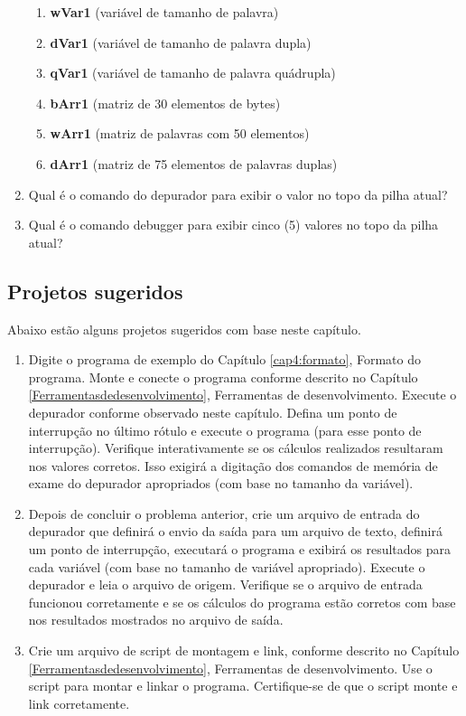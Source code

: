 \begin{enumerate}
\begin{enumerate}
    	\item \textbf{wVar1} (variável de tamanho de palavra)
    	\item \textbf{dVar1} (variável de tamanho de palavra dupla)
    	\item \textbf{qVar1} (variável de tamanho de palavra quádrupla)
    	\item \textbf{bArr1} (matriz de 30 elementos de bytes)
    	\item \textbf{wArr1} (matriz de palavras com 50 elementos)
    	\item \textbf{dArr1} (matriz de 75 elementos de palavras duplas)
    \end{enumerate}
    \item  Qual é o comando do depurador para exibir o valor no topo da pilha atual?
    \item Qual é o comando debugger para exibir cinco (5) valores no topo da pilha atual?
\end{enumerate}

\subsection{Projetos sugeridos}
Abaixo estão alguns projetos sugeridos com base neste capítulo.
\begin{enumerate}
	\item Digite o programa de exemplo do Capítulo \ref{cap4:formato}, Formato do programa. Monte e conecte o programa conforme descrito no Capítulo \ref{Ferramentasdedesenvolvimento}, Ferramentas de desenvolvimento. Execute o depurador conforme observado neste capítulo. Defina um ponto de interrupção no último rótulo e execute o programa (para esse ponto de interrupção). Verifique interativamente se os cálculos realizados resultaram nos valores corretos. Isso exigirá a digitação dos comandos de memória de exame do depurador apropriados (com base no tamanho da variável).
	\item Depois de concluir o problema anterior, crie um arquivo de entrada do depurador que definirá o envio da saída para um arquivo de texto, definirá um ponto de interrupção, executará o programa e exibirá os resultados para cada variável (com base no tamanho de variável apropriado). Execute o depurador e leia o arquivo de origem. Verifique se o arquivo de entrada funcionou corretamente e se os cálculos do programa estão corretos com base nos resultados mostrados no arquivo de saída.
	\item Crie um arquivo de script de montagem e link, conforme descrito no Capítulo \ref{Ferramentasdedesenvolvimento}, Ferramentas de desenvolvimento. Use o script para montar e linkar o programa. Certifique-se de que o script monte e link corretamente.
\end{enumerate}


